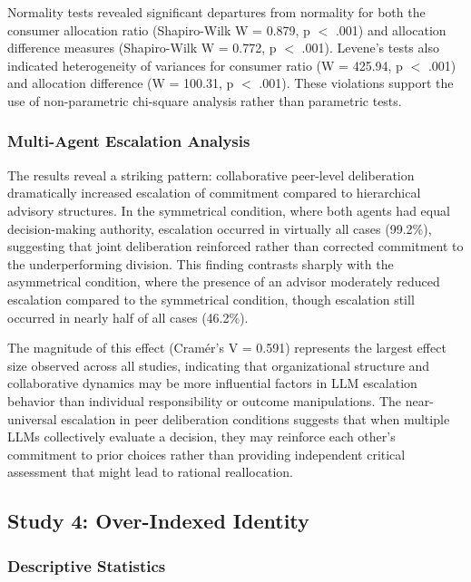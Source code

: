 \documentclass[letterpaper]{article} %
\begin{document}
Normality tests revealed significant departures from normality for both the consumer allocation ratio (Shapiro-Wilk W = 0.879, p $<$ .001) and allocation difference measures (Shapiro-Wilk W = 0.772, p $<$ .001). Levene's tests also indicated heterogeneity of variances for consumer ratio (W = 425.94, p $<$ .001) and allocation difference (W = 100.31, p $<$ .001). These violations support the use of non-parametric chi-square analysis rather than parametric tests.

\subsubsection{Multi-Agent Escalation Analysis}

The results reveal a striking pattern: collaborative peer-level deliberation dramatically increased escalation of commitment compared to hierarchical advisory structures. In the symmetrical condition, where both agents had equal decision-making authority, escalation occurred in virtually all cases (99.2\%), suggesting that joint deliberation reinforced rather than corrected commitment to the underperforming division. This finding contrasts sharply with the asymmetrical condition, where the presence of an advisor moderately reduced escalation compared to the symmetrical condition, though escalation still occurred in nearly half of all cases (46.2\%).

The magnitude of this effect (Cramér's V = 0.591) represents the largest effect size observed across all studies, indicating that organizational structure and collaborative dynamics may be more influential factors in LLM escalation behavior than individual responsibility or outcome manipulations. The near-universal escalation in peer deliberation conditions suggests that when multiple LLMs collectively evaluate a decision, they may reinforce each other's commitment to prior choices rather than providing independent critical assessment that might lead to rational reallocation.

\subsection{Study 4: Over-Indexed Identity}


\subsubsection{Descriptive Statistics}
\end{document}
